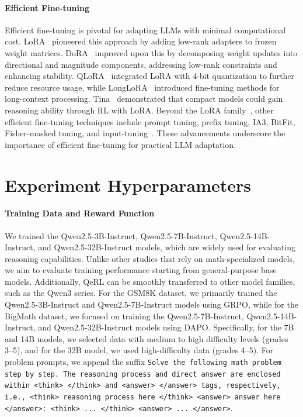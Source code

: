 \paragraph{Efficient Fine-tuning}
Efficient fine-tuning is pivotal for adapting LLMs with minimal computational cost. LoRA~\citep{lora} pioneered this approach by adding low-rank adapters to frozen weight matrices. DoRA~\citep{dora} improved upon this by decomposing weight updates into directional and magnitude components, addressing low-rank constraints and enhancing stability. QLoRA~\citep{qlora} integrated LoRA with 4-bit quantization to further reduce resource usage, while LongLoRA~\citep{longlora} introduced fine-tuning methods for long-context processing. Tina~\citep{tina} demonstrated that compact models could gain reasoning ability through RL with LoRA. Beyond the LoRA family~\citep{lora}, other efficient fine-tuning techniques include prompt tuning, prefix tuning, IA3, BitFit, Fisher-masked tuning, and input-tuning~\citep{prompt-tuning,prefix-tuning,ia-3,bitfit,fisher-mask,input-tuning,guo2023lq}. These advancements underscore the importance of efficient fine-tuning for practical LLM adaptation.



\section{Experiment Hyperparameters}\label{ap:hyper}

\paragraph{Training Data and Reward Function} We trained the Qwen2.5-3B-Instruct, Qwen2.5-7B-Instruct, Qwen2.5-14B-Instruct, and Qwen2.5-32B-Instruct models, which are widely used for evaluating reasoning capabilities. Unlike other studies that rely on math-specialized models, we aim to evaluate training performance starting from general-purpose base models. Additionally, QeRL can be smoothly transferred to other model families, such as the Qwen3 series. For the GSM8K dataset, we primarily trained the Qwen2.5-3B-Instruct and Qwen2.5-7B-Instruct models using GRPO, while for the BigMath dataset, we focused on training the Qwen2.5-7B-Instruct, Qwen2.5-14B-Instruct, and Qwen2.5-32B-Instruct models using DAPO. Specifically, for the 7B and 14B models, we selected data with medium to high difficulty levels (grades 3–5), and for the 32B model, we used high-difficulty data (grades 4–5). For problem prompts, we append the suffix \texttt{Solve the following math problem step by step. The reasoning process and direct answer are enclosed within <think> </think> and <answer> </answer> tags, respectively, i.e., <think> reasoning process here </think> <answer> answer here </answer>: 
<think>
...
</think>
<answer>
...
</answer>}.

